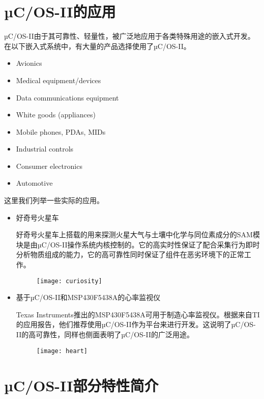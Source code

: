 \documentclass{ctexart}
\begin{document}
\section{µC/OS-II的应用}

µC/OS-II由于其可靠性、轻量性，被广泛地应用于各类特殊用途的嵌入式开发。在以下嵌入式系统中，有大量的产品选择使用了µC/OS-II。
\begin{itemize}
  \item Avionics
  \item Medical equipment/devices
  \item Data communications equipment
  \item White goods (appliances)
  \item Mobile phones, PDAs, MIDs
  \item Industrial controls
  \item Consumer electronics
  \item Automotive
\end{itemize}
这里我们列举一些实际的应用。
\begin{itemize}
  \item 好奇号火星车\par
    好奇号火星车上搭载的用来探测火星大气与土壤中化学与同位素成分的SAM模块是由µC/OS-II操作系统内核控制的。它的高实时性保证了配合采集行为即时分析物质组成的能力，它的高可靠性同时保证了组件在恶劣环境下的正常工作。\par
    \begin{figure}[h]
\centering
    \texttt{[image: curiosity]}
    \end{figure}
  \item 基于µC/OS-II和MSP430F5438A的心率监视仪\par
    Texas Instruments推出的MSP430F5438A可用于制造心率监视仪。根据来自TI的应用报告，他们推荐使用µC/OS-II作为平台来进行开发。这说明了µC/OS-II的高可靠性，同样也侧面表明了µC/OS-II的广泛用途。\par
    \begin{figure}[h]
\centering
    \texttt{[image: heart]}
    \end{figure}
\end{itemize}

\section{µC/OS-II部分特性简介}
\end{document}
